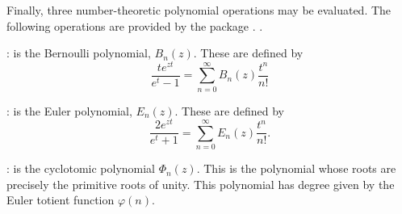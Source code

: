 {{{{{{{{{{{Finally, three number-theoretic polynomial operations may be evaluated.
The following operations are provided by the package
.
.

\noindent
{}:  \hbox{}\hfill\newline
    is the  Bernoulli polynomial,
   $B_n (z)$.  These are defined by
\begin{displaymath}
\frac{t e^{z t}}{e^t - 1} = \sum_{n=0}^{\infty} B_n (z) \frac{t^n}{n!}
\end{displaymath}

\noindent
{}:  \hbox{}\hfill\newline
    is the  Euler polynomial,
   $E_n (z)$.  These are defined by
\begin{displaymath}
\frac{2 e^{z t}}{e^t + 1} = \sum_{n=0}^{\infty} E_n (z) \frac{t^n}{n!}.
\end{displaymath}

\noindent
{}: \hbox{}\hfill\newline
    is the  cyclotomic polynomial
   $\Phi_n (z)$.  This is the polynomial whose
   roots are precisely the primitive  roots of unity.
   This polynomial has degree given by the Euler totient function
   $\varphi(n)$.

}}}}}}}}}}}
